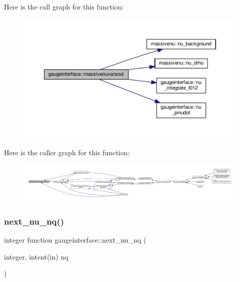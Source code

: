 Here is the call graph for this function\+:
\nopagebreak
\begin{figure}[H]
\begin{center}
\leavevmode
\includegraphics[width=350pt]{namespacegaugeinterface_ac756539212eaeba8021159b26d1d2881_cgraph}
\end{center}
\end{figure}
Here is the caller graph for this function\+:
\nopagebreak
\begin{figure}[H]
\begin{center}
\leavevmode
\includegraphics[width=350pt]{namespacegaugeinterface_ac756539212eaeba8021159b26d1d2881_icgraph}
\end{center}
\end{figure}
\mbox{\label{namespacegaugeinterface_ae317d979138ff46a65c14f787c0d749c}} 
\subsubsection{\texorpdfstring{next\+\_\+nu\+\_\+nq()}{next\_nu\_nq()}}
{\footnotesize\ttfamily integer function gaugeinterface\+::next\+\_\+nu\+\_\+nq (\begin{DoxyParamCaption}\item[{integer, intent(in)}]{nq }\end{DoxyParamCaption})}



